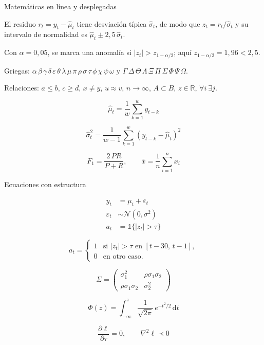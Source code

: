 \documentclass[aspectratio=169,9pt]{beamer}
\begin{document}
\begin{frame}{Matemáticas en línea y desplegadas}
\begin{twocols}

  El residuo $r_t = y_t - \hat\mu_t$ tiene desviación típica $\hat\sigma_t$,
  de modo que $z_t = r_t / \hat\sigma_t$ y su intervalo de normalidad es
  $\hat\mu_t \pm 2{,}5\,\hat\sigma_t$.

  Con $\alpha = 0{,}05$, se marca una anomalía si $|z_t| > z_{1-\alpha/2}$;
  aquí $z_{1-\alpha/2} = 1{,}96 < 2{,}5$.

  Griegas: $\alpha\,\beta\,\gamma\,\delta\,\varepsilon\,\theta\,\lambda\,\mu\,
  \pi\,\rho\,\sigma\,\tau\,\phi\,\chi\,\psi\,\omega$ y
  $\Gamma\,\Delta\,\Theta\,\Lambda\,\Xi\,\Pi\,\Sigma\,\Phi\,\Psi\,\Omega$.

  Relaciones: $a \le b$, $c \ge d$, $x \ne y$, $u \approx v$,
  $n \to \infty$, $A \subset B$, $z \in \mathbb{R}$, $\forall i\ \exists j$.
\nextcol

  \[
    \hat\mu_t = \frac{1}{w} \sum_{k=1}^{w} y_{t-k}
  \]

  \[
    \hat\sigma_t^2 = \frac{1}{w-1} \sum_{k=1}^{w}
      \left( y_{t-k} - \hat\mu_t \right)^2
  \]

  \[
    F_1 = \frac{2\,PR}{P + R},
    \qquad
    \bar x = \frac{1}{n}\sum_{i=1}^{n} x_i
  \]
\end{twocols}
\end{frame}

\begin{frame}{Ecuaciones con estructura}
\begin{twocols}

  \begin{align*}
    y_t           &= \mu_t + \varepsilon_t \\
    \varepsilon_t &\sim \mathcal{N}(0, \sigma^2) \\
    a_t           &= \mathbb{1}\{|z_t| > \tau\}
  \end{align*}


  \[
    a_t =
    \begin{cases}
      1 & \text{si } |z_t| > \tau \text{ en } [t-30,\, t-1],\\
      0 & \text{en otro caso.}
    \end{cases}
  \]
\nextcol

  \[
    \Sigma =
    \begin{pmatrix}
      \sigma_1^2 & \rho\sigma_1\sigma_2 \\
      \rho\sigma_1\sigma_2 & \sigma_2^2
    \end{pmatrix}
  \]

  \[
    \Phi(z) = \int_{-\infty}^{z}
      \frac{1}{\sqrt{2\pi}}\, e^{-t^2/2}\, \mathrm{d}t
  \]

  \[
    \frac{\partial \ell}{\partial \tau} = 0,
    \qquad
    \nabla^2 \ell \prec 0
  \]
\end{twocols}
\end{frame}
\end{document}
